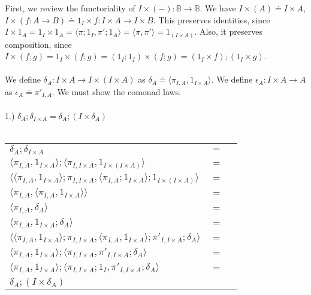 \documentclass{article}
\begin{document}
First, we review the functoriality of $I \times (-) : \mathbb B \to \mathbb B$.
We have $I \times (A) \doteq I \times A$, $I \times (f : A \to B) \doteq 1_I \times f : I \times A \to I \times B$.
This preserves identities, since 
$I \times 1_A = 1_I \times 1_A = \langle \pi;1_I, \pi';1_A \rangle = \langle \pi, \pi' \rangle = 1_{(I \times A)}$.
Also, it preserves composition, since 
$I \times (f;g) = 1_I \times (f;g) = (1_I;1_I) \times (f;g) = (1_I \times f) ; (1_I \times g)$.\\~\\
We define $\delta_A : I \times A \to I \times (I \times A)$ as 
$\delta_A \doteq \langle \pi_{I,A}, 1_{I \times A}\rangle$. We define $\epsilon_A : I \times A \to A$ as 
$\epsilon_A \doteq \pi'_{I,A}$.
We must show the comonad laws.\\~\\
1.) $\delta_{A};\delta_{I \times A} = \delta_{A};(I \times \delta_A)$\\~\\
\begin{tabular}{lll}
$\delta_A;\delta_{I \times A}$ & $=$ & \\
$\langle \pi_{I,A},1_{I \times A} \rangle;\langle \pi_{I, I \times A}, 1_{I \times (I \times A)} \rangle$ & $=$ & \\ 
$\langle \langle \pi_{I,A},1_{I \times A} \rangle;\pi_{I, I \times A}, \langle \pi_{I,A};1_{I \times A} \rangle;1_{I \times (I \times A)} \rangle$ & $=$ & \\ 
$\langle \pi_{I,A}, \langle \pi_{I,A},1_{I \times A} \rangle \rangle$ & $=$ & \\

$\langle \pi_{I,A}, \delta_A \rangle$ & $=$ & \\

$\langle \pi_{I,A}, 1_{I \times A};\delta_A \rangle$ & $=$ & \\

$\langle \langle \pi_{I,A},1_{I \times A} \rangle;\pi_{I,I \times A}, \langle \pi_{I,A},1_{I \times A} \rangle;\pi'_{I,I \times A};\delta_A \rangle$ & $=$ & \\

$\langle \pi_{I,A},1_{I \times A} \rangle;\langle \pi_{I,I \times A}, \pi'_{I,I \times A};\delta_A \rangle$ & $=$ & \\
$\langle \pi_{I,A},1_{I \times A} \rangle;\langle \pi_{I,I \times A};1_I, \pi'_{I,I \times A};\delta_A \rangle$ & $=$ & \\
$\delta_A;(I \times \delta_A)$ & &

\end{tabular}
\end{document}
